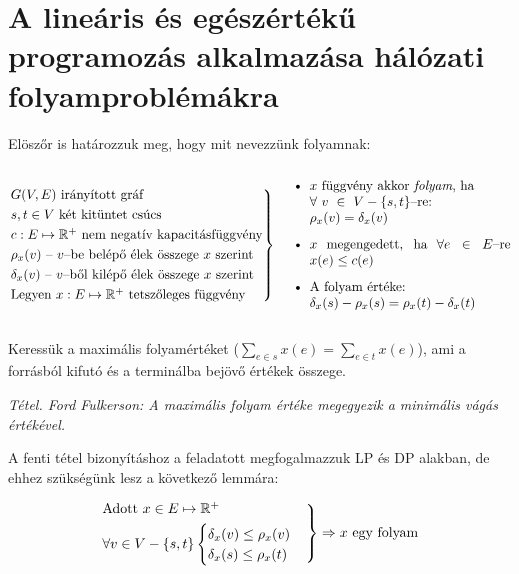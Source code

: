 \section{A lineáris és egészértékű programozás alkalmazása hálózati folyamproblémákra}

Elöszőr is határozzuk meg, hogy mit nevezzünk folyamnak:

\[
	\begin{rcases}
		G(V,E) \mbox{ irányított gráf}                                               \\
		s,t \in V \mbox{ két kitüntet csúcs}                                         \\
		c : E \mapsto \mathbb{R}^+ \mbox{ nem negatív kapacitásfüggvény}             \\
		\rho_x(v) \mbox{ -- } v\mbox{--be belépő élek összege } x \mbox{ szerint}    \\
		\delta_x(v) \mbox{ -- } v\mbox{--ből kilépő élek összege } x \mbox{ szerint} \\
		\mbox{Legyen }x : E \mapsto \mathbb{R}^+ \mbox{ tetszőleges függvény}
	\end{rcases} \parbox[c]{6.2cm}{
	\begin{itemize}
	\item $x$ függvény akkor \emph{folyam}, ha \\ $\forall~v~\in~V - \{s,t\}$--re: \\ $\rho_x(v)=\delta_x(v)$
	\item $x$ megengedett, ha $\forall e \in E$--re $x(e) \leq c(e)$ %
	\item A folyam értéke: \\ $\delta_x(s)-\rho_x(s)=\rho_x(t)-\delta_x(t)$
	\end{itemize}
	}
\]

Keressük a maximális folyamértéket ($\sum_{e \in s}x(e)=\sum_{e \in t}x(e)$),
ami a forrásból kifutó és a terminálba bejövő értékek összege.

\vspace{0.4cm}
\emph{Tétel. Ford Fulkerson: A maximális folyam értéke megegyezik a minimális vágás értékével.}
\vspace{0.4cm}

A fenti tétel bizonyításhoz a feladatott megfogalmazzuk LP és DP alakban, de
ehhez szükségünk lesz a következő lemmára:

\[
	\begin{rcases}
		\mbox{Adott } x \in E \mapsto \mathbb{R}^+ \\
		\forall v \in V - \{s,t\} \begin{cases}
			                          \delta_x(v) \leq \rho_x(v) \\
			                          \delta_x(s) \leq \rho_x(t)
		                          \end{cases}
	\end{rcases}
	\Rightarrow  x \mbox{ egy folyam}
\]

